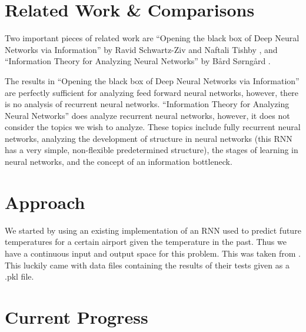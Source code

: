 \section{Related Work \& Comparisons}
Two important pieces of related work are “Opening the black box of Deep Neural
Networks via Information” by Ravid Schwartz-Ziv and Naftali Tishby
\cite{DBLP:journals/corr/Shwartz-ZivT17}, and “Information Theory for Analyzing
Neural Networks” by B\aa rd S\o rng\aa rd \cite{ntnu}.

The results in “Opening the black box of Deep Neural Networks via Information” are perfectly sufficient for analyzing feed forward neural networks, however, there is no analysis of recurrent neural networks. “Information Theory for Analyzing Neural Networks” does analyze recurrent neural networks, however, it does not consider the topics we wish to analyze. These topics include fully recurrent neural networks, analyzing the development of structure in neural networks (this RNN has a very simple, non-flexible predetermined structure), the stages of learning in neural networks, and the concept of an information bottleneck. 

\section{Approach}
We started by using an existing implementation of an RNN used to predict future
temperatures for a certain airport given the temperature in the past. Thus we
have a continuous input and output space for this problem. This was taken from
\cite{weather}. This luckily came with data files containing the results of
their tests given as a .pkl file.

\section{Current Progress}

